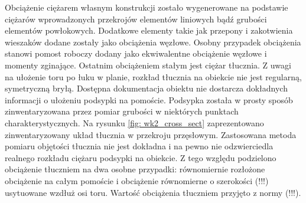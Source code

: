 Obciążenie ciężarem własnym konstrukcji zostało wygenerowane na podstawie ciężarów wprowadzonych przekrojów elementów liniowych bądź grubości elementów powłokowych. Dodatkowe elementy takie jak przepony i zakotwienia wieszaków dodane zostały jako obciążenia węzłowe. Osobny przypadek obciążenia stanowi pomost roboczy dodany jako ekwiwalentne obciążenie węzłowe i momenty zginające. Ostatnim obciążeniem stałym jest ciężar tłucznia. Z uwagi na ułożenie toru po łuku w planie, rozkład tłucznia na obiekcie nie jest regularną, symetryczną bryłą. Dostępna dokumentacja obiektu nie dostarcza dokładnych informacji o ułożeniu podsypki na pomoście. Podsypka została w prosty sposób zinwentaryzowana przez pomiar grubości w niektórych punktach charakterystycznych. Na rysunku \ref{fig: wk2_cross_sect} zaprezentowano zinwentaryzowany układ tłucznia w przekroju przęsłowym. Zastosowana metoda pomiaru objętości tłucznia nie jest dokładna i na pewno nie odzwierciedla realnego rozkładu ciężaru podsypki na obiekcie. Z tego względu podzielono obciążenie tłuczniem na dwa osobne przypadki: równomiernie rozłożone obciążenie na całym pomoście i obciążenie równomierne o szerokości (!!!) usytuowane wzdłuż osi toru. Wartość obciążenia tłuczniem przyjęto z normy (!!!).
